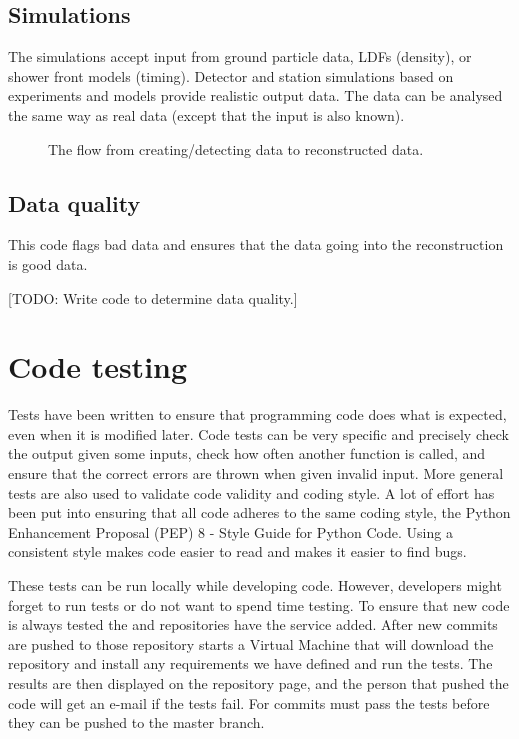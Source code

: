 \subsection{Simulations}

The simulations accept input from \corsika ground particle data, LDFs
(density), or shower front models (timing). Detector and station simulations based on experiments and models provide realistic output data. The data can be analysed the same way as real \hisparc data (except that the input is
also known).

\begin{figure}
    \centering
    
    \caption{ The flow from
             creating/detecting data to reconstructed data.}
    \label{fig:sapphire-flow}
\end{figure}


\subsection{Data quality}

This code flags bad data and ensures that the data going into the
reconstruction is good data.

[TODO: Write code to determine data quality.]


\section{Code testing}

Tests have been written to ensure that programming code does what is
expected, even when it is modified later. Code tests can be very
specific and precisely check the output given some inputs, check how
often another function is called, and ensure that the correct errors are
thrown when given invalid input. More general tests are also used to
validate code validity and coding style. A lot of effort has been put
into ensuring that all \python code adheres to the same coding style,
the Python Enhancement Proposal (PEP) 8 - Style Guide for Python Code. Using a consistent style makes code easier to read and makes it easier to find bugs.

These tests can be run locally while developing code. However,
developers might forget to run tests or do not want to spend time
testing. To ensure that new code is always tested the \sapphire and
\jsparc repositories have the \travis service \cite{travis} added. After
new commits are pushed to those repository \travis starts a Virtual
Machine that will download the repository and install any requirements we have defined and run the tests. The results are then displayed on the
repository page, and the person that pushed the code will get an e-mail
if the tests fail. For \sapphire commits must pass the tests before they can be pushed to the master branch.


